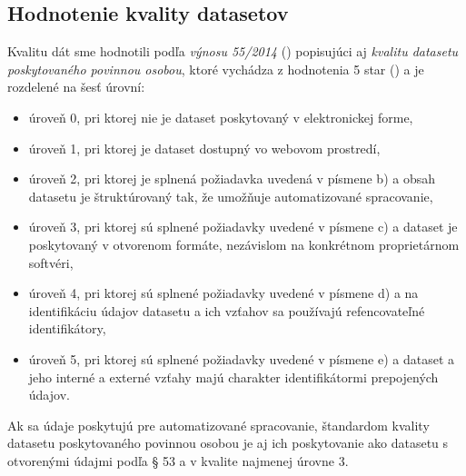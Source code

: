 \documentclass[12pt,a4paper]{article}
\begin{document}
\subsection*{Hodnotenie kvality datasetov}
\label{zakon-kvalita} 
Kvalitu dát sme hodnotili podľa \emph{výnosu 55/2014} (\cite{kvalita}) popisujúci aj \emph{kvalitu datasetu poskytovaného povinnou osobou}, ktoré vychádza z hodnotenia 5 star (\cite{5star}) a je rozdelené na šesť úrovní: 
\begin{itemize} 
\item úroveň 0, pri ktorej nie je dataset poskytovaný
v elektronickej forme,
\item úroveň 1, pri ktorej je dataset dostupný vo webovom
prostredí,
\item úroveň 2, pri ktorej je splnená požiadavka uvedená
v písmene b) a obsah datasetu je štruktúrovaný tak,
že umožňuje automatizované spracovanie,
\item úroveň 3, pri ktorej sú splnené požiadavky uvedené
v písmene c) a dataset je poskytovaný v otvorenom
formáte, nezávislom na konkrétnom proprietárnom
softvéri,
\item úroveň 4, pri ktorej sú splnené požiadavky uvedené
v písmene d) a na identifikáciu údajov datasetu a ich
vzťahov sa používajú refencovateľné identifikátory,
\item úroveň 5, pri ktorej sú splnené požiadavky uvedené
v písmene e) a dataset a jeho interné a externé
vzťahy majú charakter identifikátormi prepojených
údajov.
\end{itemize} 

Ak sa údaje poskytujú pre automatizované spracovanie, štandardom kvality datasetu poskytovaného
povinnou osobou je aj ich poskytovanie ako datasetu s otvorenými údajmi podľa § 53 a v kvalite najmenej úrovne 3.
\end{document}
